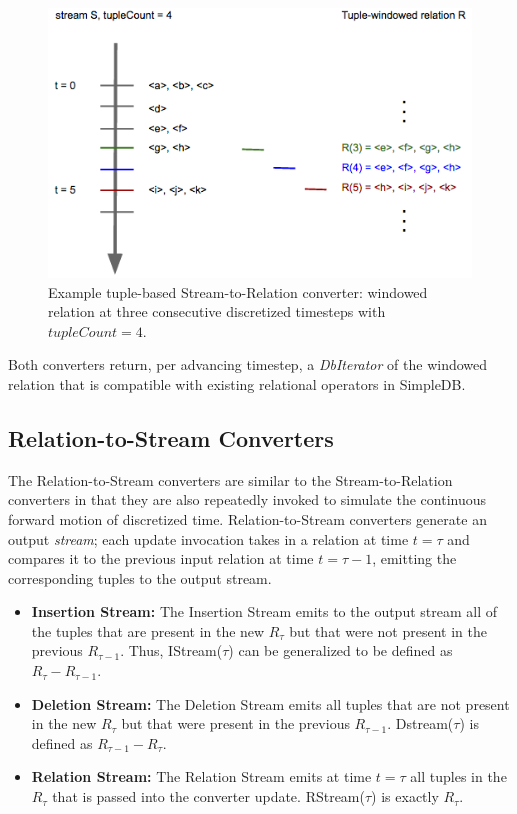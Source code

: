 \documentclass[a4paper, 10pt, conference]{IEEEconf}
\begin{document}
\begin{itemize}
\begin{figure}[h!]
    \centering
    \centerline{\includegraphics[totalheight=4cm]{tuple_window.png}}
    \caption{Example tuple-based Stream-to-Relation converter: windowed relation at three consecutive discretized timesteps with $tupleCount = 4$.}
    \label{fig:tuple_window}
\end{figure}
\end{itemize}

Both converters return, per advancing timestep, a \textit{DbIterator} of the windowed relation that is compatible with existing relational operators in SimpleDB.

\subsection{Relation-to-Stream Converters}
The Relation-to-Stream converters are similar to the Stream-to-Relation converters in that they are also repeatedly invoked to simulate the continuous forward motion of discretized time. Relation-to-Stream converters generate an output \textit{stream}; each update invocation takes in a relation at time $t = \tau$ and compares it to the previous input relation at time $t = \tau - 1$, emitting the corresponding tuples to the output stream. 

\begin{itemize}
\item \textbf{Insertion Stream:} The Insertion Stream emits to the output stream all of the tuples that are present in the new $R_\tau$ but that were not present in the previous $R_{\tau - 1}$. Thus, IStream($\tau$) can be generalized to be defined as $R_{\tau} - R_{\tau - 1}$.

\item \textbf{Deletion Stream:} The Deletion Stream emits all tuples that are not present in the new $R_{\tau}$ but that were present in the previous $R_{\tau - 1}$. Dstream($\tau$) is defined as $R_{\tau - 1} - R_{\tau}$.

\item \textbf{Relation Stream:} The Relation Stream emits at time $t = \tau$ all tuples in the $R_{\tau}$ that is passed into the converter update. RStream($\tau$) is exactly $R_{\tau}$.
\end{itemize}
\end{document}
